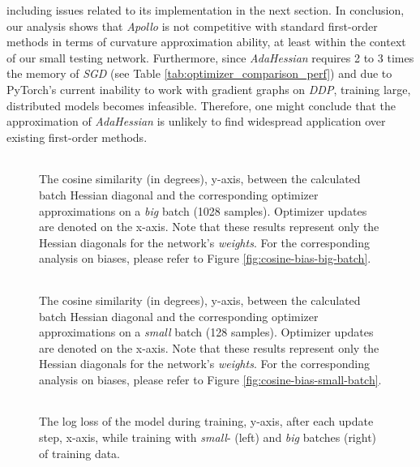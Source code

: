 including issues related to its implementation in the next section.
In conclusion, our analysis shows that \emph{Apollo} is not competitive with standard first-order methods in terms of curvature approximation ability,
at least within the context of our small testing network.
Furthermore, since \emph{AdaHessian} requires 2 to 3 times the memory of \emph{SGD} (see Table \ref{tab:optimizer_comparison_perf})
and due to PyTorch's current inability to work with gradient graphs on \emph{DDP}, training large, distributed models becomes infeasible.
Therefore, one might conclude that the approximation of \emph{AdaHessian} is unlikely to find widespread application over existing first-order methods.
\begin{figure}[h!]
    \centering
    \begin{tabular}{cc}
         \\ %
    \end{tabular}
    \caption{The cosine similarity (in degrees), y-axis, between the calculated batch Hessian diagonal and the corresponding optimizer approximations on a \emph{big} batch (1028 samples).
    Optimizer updates are denoted on the x-axis.
    Note that these results represent only the Hessian diagonals for the network's \emph{weights}. For the corresponding analysis on biases, please refer to Figure \ref{fig:cosine-bias-big-batch}.}
    \label{fig:cosine-big-batch}
\end{figure}


\begin{figure}[h!]
    \centering
    \begin{tabular}{cc}
         \\ %
    \end{tabular}
    \caption{The cosine similarity (in degrees), y-axis, between the calculated batch Hessian diagonal and the corresponding optimizer approximations on a \emph{small} batch (128 samples).
    Optimizer updates are denoted on the x-axis.
    Note that these results represent only the Hessian diagonals for the network's \emph{weights}. For the corresponding analysis on biases, please refer to Figure \ref{fig:cosine-bias-small-batch}.
}
    \label{fig:cosine-small-batch}
\end{figure}

\begin{figure}[h!]
    \centering
    \begin{tabular}{cc}
         \\ %
    \end{tabular}
    \caption{The log loss of the model during training, y-axis, after each update step, x-axis, while training with  \emph{small}- (left) and \emph{big} batches (right) of training data.}
    \label{fig:loss-big-batch}
\end{figure}


